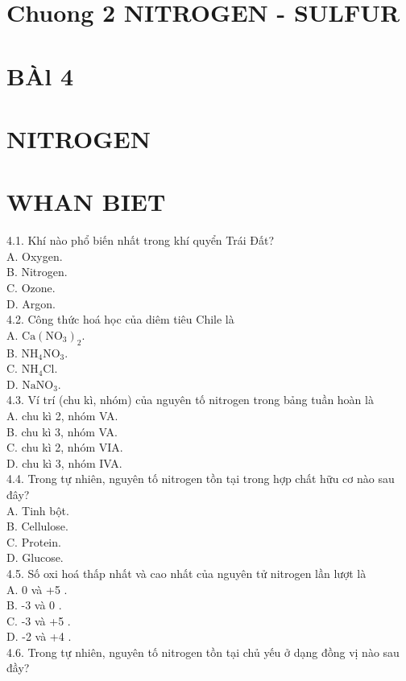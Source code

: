 \documentclass[10pt]{article}
\begin{document}
\section*{Chuong 2 NITROGEN - SULFUR}
\section*{BÀl 4}
\section*{NITROGEN}
\section*{WHAN BIET}
4.1. Khí nào phổ biến nhất trong khí quyển Trái Đất?\\
A. Oxygen.\\
B. Nitrogen.\\
C. Ozone.\\
D. Argon.\\
4.2. Công thức hoá học của diêm tiêu Chile là\\
A. $\mathrm{Ca}\left(\mathrm{NO}_{3}\right)_{2}$.\\
B. $\mathrm{NH}_{4} \mathrm{NO}_{3}$.\\
C. $\mathrm{NH}_{4} \mathrm{Cl}$.\\
D. $\mathrm{NaNO}_{3}$.\\
4.3. Ví trí (chu kì, nhóm) của nguyên tố nitrogen trong bảng tuần hoàn là\\
A. chu kì 2, nhóm VA.\\
B. chu kì 3, nhóm VA.\\
C. chu kì 2, nhóm VIA.\\
D. chu kì 3, nhóm IVA.\\
4.4. Trong tự nhiên, nguyên tố nitrogen tồn tại trong hợp chất hữu cơ nào sau đây?\\
A. Tinh bột.\\
B. Cellulose.\\
C. Protein.\\
D. Glucose.\\
4.5. Số oxi hoá thấp nhất và cao nhất của nguyên tử nitrogen lần lượt là\\
A. 0 và +5 .\\
B. -3 và 0 .\\
C. -3 và +5 .\\
D. -2 và +4 .\\
4.6. Trong tự nhiên, nguyên tố nitrogen tồn tại chủ yếu ở dạng đồng vị nào sau đầy?\\
\end{document}
